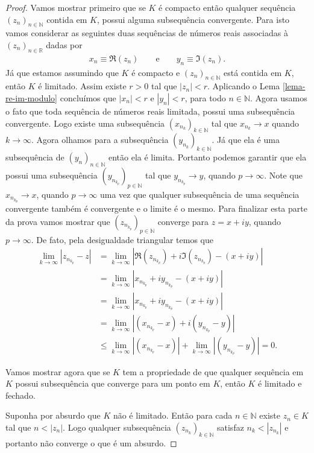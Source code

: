 \begin{proof}
Vamos mostrar primeiro que se $K$ é compacto então qualquer sequência $(z_n)_{n\in\mathbb{N}}$
contida em $K$, possui alguma subsequência convergente.
Para isto vamos considerar as seguintes duas sequências de números reais associadas à $(z_n)_{n\in\mathbb{R}}$ dadas por
\begin{align*}
x_n \equiv \Re(z_n) \qquad\text{e}\qquad y_n\equiv \Im(z_n).
\end{align*}
Já que estamos assumindo que $K$ é compacto e $(z_n)_{n\in\mathbb{N}}$
está contida em $K$, então $K$ é limitado. Assim existe 
$r>0$ tal que $|z_n|<r$. Aplicando o Lema \ref{lema-re-im-modulo} 
concluímos que $|x_n|< r$ e $|y_n|< r$, para todo $n\in\mathbb{N}$. 
Agora usamos o fato que toda sequência de números reais limitada, possui
uma subsequência convergente. Logo existe uma subsequência $(x_{n_k})_{k\in\mathbb{N}}$ 
tal que $x_{n_k}\to x$ quando $k\to\infty$. Agora olhamos para a 
subsequência $(y_{n_k})_{k\in\mathbb{N}}$. Já que ela é uma subsequência de $(y_n)_{n\in\mathbb{N}}$ então 
ela é limita. Portanto podemos garantir que ela possui 
uma subsequência $(y_{n_{k_p}})_{p\in\mathbb{N}}$ tal que $y_{n_{k_p}}\to y$, quando $p\to\infty$.  
Note que $x_{n_{k_p}}\to x$, quando $p\to\infty$ uma vez que qualquer subsequência de uma sequência 
convergente também é convergente e o limite é o mesmo. 
Para finalizar esta parte da prova vamos mostrar que $(z_{n_{k_p}})_{p\in\mathbb{N}}$ converge
para $z=x+iy$, quando $p\to\infty$. De fato, pela desigualdade triangular temos que 
\begin{align*}
\lim_{k\to\infty} |z_{n_{k_p}} -z |
&=
\lim_{k\to\infty} |\Re(z_{n_{k_p}})+i\Im(z_{n_{k_p}}) - (x+iy)|
\\
&=
\lim_{k\to\infty} |x_{n_{k_p}}+iy_{n_{k_p}} - (x+iy)|
\\
&=
\lim_{k\to\infty} |x_{n_{k_p}}+iy_{n_{k_p}} - (x+iy)|
\\
&=
\lim_{k\to\infty} |(x_{n_{k_p}}-x)+i (y_{n_{k_p}}-y)|
\\
&\leqslant 
\lim_{k\to\infty} |(x_{n_{k_p}}-x)|
+
\lim_{k\to\infty} |(y_{n_{k_p}}-y)|=0.
\end{align*}

Vamos mostrar agora que se $K$ tem a propriedade de que qualquer sequência em $K$ possui 
subsequência que converge para um ponto em $K$, então $K$ é limitado e fechado. 


Suponha por absurdo que $K$ não é limitado.
Então para cada $n\in\mathbb{N}$ existe $z_n\in K$ tal que $n<|z_n|$. Logo qualquer subsequência
$(z_{n_k})_{k\in\mathbb{N}}$ satisfaz $n_k<|z_{n_k}|$ e portanto não converge o que é um absurdo.



\end{proof}
